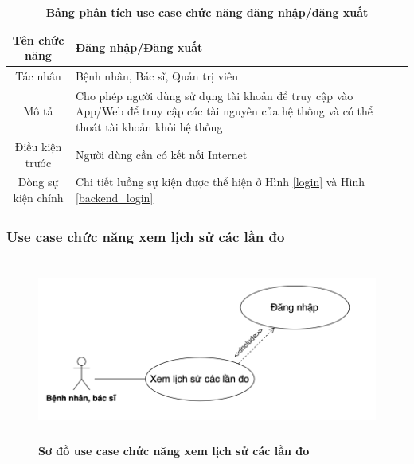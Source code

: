   \begin{table}[H]
    \caption{\bfseries \fontsize{12pt}{0pt}\selectfont Bảng phân tích use case chức năng đăng nhập/đăng xuất}
    \centering
    \begin{tabularx}{0.9\textwidth}{|c|X|}
      \hline
      \textbf{Tên chức năng} & \textbf{Đăng nhập/Đăng xuất} \\
      \hline
      Tác nhân & Bệnh nhân, Bác sĩ, Quản trị viên \\
      \hline
      Mô tả & Cho phép người dùng sử dụng tài khoản để truy cập vào App/Web để truy cập các tài nguyên của hệ thống và
      có thể thoát tài khoản khỏi hệ thống\\
      \hline
      Điều kiện trước & Người dùng cần có kết nối Internet \\
      \hline
      Dòng sự kiện chính & 
        Chi tiết luồng sự kiện được thể hiện ở Hình \ref{login} và Hình \ref{backend_login}\\
      \hline
    \end{tabularx}
  \end{table}

\subsubsection{Use case chức năng xem lịch sử các lần đo}
  \begin{figure}[H]
    \centering
    \includegraphics[width=15cm,height=6cm]{Images/use_case/use_case_view_history_record.png}
    \caption[Sơ đồ use case chức năng xem lịch sử các lần đo]{\bfseries \fontsize{12pt}{0pt}
    \selectfont Sơ đồ use case chức năng xem lịch sử các lần đo}
    \label{use_case_view_history_record} %
  \end{figure}

